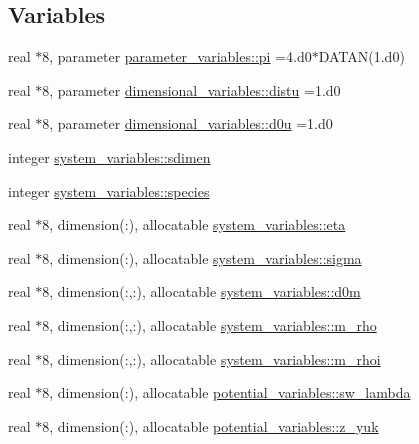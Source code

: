 \subsection*{Variables}
\begin{DoxyCompactItemize}
\item 
real $\ast$8, parameter \hyperlink{namespaceparameter__variables_a2379ce10254e090927e96805b35bac16}{parameter\+\_\+variables\+::pi} =4.d0$\ast$D\+A\+T\+AN(1.d0)
\item 
real $\ast$8, parameter \hyperlink{namespacedimensional__variables_a227a932014a237911a8056b6958a775d}{dimensional\+\_\+variables\+::distu} =1.d0
\item 
real $\ast$8, parameter \hyperlink{namespacedimensional__variables_a74941571057c34bc06c7ba83dc5bc762}{dimensional\+\_\+variables\+::d0u} =1.d0
\item 
integer \hyperlink{namespacesystem__variables_a6daf314984d1b1af3add98d0183cece5}{system\+\_\+variables\+::sdimen}
\item 
integer \hyperlink{namespacesystem__variables_a5cbe3284a50e8855776c84f6ab36a0b9}{system\+\_\+variables\+::species}
\item 
real $\ast$8, dimension(\+:), allocatable \hyperlink{namespacesystem__variables_abace0b1eb27d0ed93f6d602742b93d64}{system\+\_\+variables\+::eta}
\item 
real $\ast$8, dimension(\+:), allocatable \hyperlink{namespacesystem__variables_ab27965e02d46e50bab5fa0a5cfc3cab8}{system\+\_\+variables\+::sigma}
\item 
real $\ast$8, dimension(\+:,\+:), allocatable \hyperlink{namespacesystem__variables_af9b49bbada067d17e1aa9feb7bde1237}{system\+\_\+variables\+::d0m}
\item 
real $\ast$8, dimension(\+:,\+:), allocatable \hyperlink{namespacesystem__variables_a29f67834297ad2a3ff687b92a32131d2}{system\+\_\+variables\+::m\+\_\+rho}
\item 
real $\ast$8, dimension(\+:,\+:), allocatable \hyperlink{namespacesystem__variables_a4037c2d31c4f9b732833108921967a0d}{system\+\_\+variables\+::m\+\_\+rhoi}
\item 
real $\ast$8, dimension(\+:), allocatable \hyperlink{namespacepotential__variables_ad070a0226da1a477dbc6dedecbca4ced}{potential\+\_\+variables\+::sw\+\_\+lambda}
\item 
real $\ast$8, dimension(\+:), allocatable \hyperlink{namespacepotential__variables_a2ce40628ea2ea5922c3f1d7ba64304e9}{potential\+\_\+variables\+::z\+\_\+yuk}
\item 

\end{DoxyCompactItemize}

